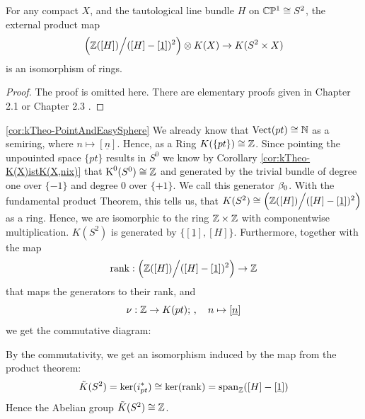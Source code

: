 \begin{theorem}\label{thm:kTheo-fundamentalProductTheorem}
	For any compact $X$, and the tautological line bundle $H$ on $\mathbb{C}\mathbb{P}^1\cong S^2$, the external product map 
	\begin{equation*}
		\Big(\mathbb{Z}([H])\Big/ ([H]-[\underline{1}])^2\Big) \otimes K(X) \to K(S^2 \times X)
	\end{equation*} is an isomorphism of rings. 
\end{theorem}
\begin{proof}
	The proof is omitted here. There are elementary proofs given in Chapter 2.1 \cite{hatcher2002algebraic} or Chapter 2.3 \cite{atiyah1989k}. 
\end{proof}
\begin{corollary}\ref{cor:kTheo-PointAndEasySphere}
	We already know that $\operatorname{\mathrm{Vect}}(pt)\cong\mathbb{N}$ as a semiring, where $n\mapsto [\underline{n}]$. Hence, as a Ring $K(\{pt\})\cong \mathbb{Z}$. Since pointing the unpouinted space $\{pt\}$ results in $S^0$ we know by Corollary \ref{cor:kTheo-K(X)istK(X,nix)} that $\operatorname{\mathrm{K}}^0(S^0)\cong \mathbb{Z}$ and generated by the trivial bundle of degree one over $\{-1\}$ and degree $0$ over $\{+1\}.$ We call this generator $\beta_0$.
	With the fundamental product Theorem, this tells us, that $K(S^{2})\cong \Big(\mathbb{Z}([H])\Big/ ([H]-[\underline{1}])^2\Big)$ as a ring. Hence, we are isomorphic to the ring $\mathbb{Z}\times \mathbb{Z}$ with componentwise multiplication.  $K(S^2)$ is generated by $\{[\underline{1}],[H]\}$. Furthermore, together with the map 
	\begin{equation*}
		\operatorname{\mathrm{rank}}: \Big(\mathbb{Z}([H])\Big/ ([H]-[\underline{1}])^2\Big)\to \mathbb{Z}
	\end{equation*} that maps the generators to their rank, and 
	\begin{equation*}
		\nu: \mathbb{Z} \to K(pt);\,,\quad n \mapsto [\underline{n}]
	\end{equation*} we get the commutative diagram:
	\begin{center}
	\end{center}
	By the commutativity, we get an isomorphism induced by the map from the product theorem: 
	\begin{equation*}
		\tilde{K}(S^2)=\ker(i_{pt}^*) \cong \ker(\operatorname{\mathrm{rank}})=\mathrm{span}_{\mathbb{Z}}([H]-[\underline{1}])
	\end{equation*}
	Hence the Abelian group $\tilde{K}(S^2)\cong \mathbb{Z}$.
\end{corollary}


